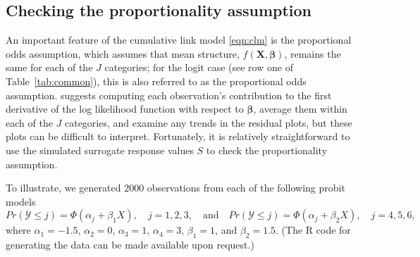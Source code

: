 \subsection{Checking the proportionality assumption}

An important feature of the cumulative link model \eqref{eqn:clm} is the proportional odds assumption, which assumes that mean structure, $f\left(\boldsymbol{X}, \boldsymbol{\beta}\right)$, remains the same for each of the $J$ categories; for the logit case (see row one of Table~\ref{tab:common}), this is also referred to as the proportional odds assumption. \citet[pp. 334--335]{regression-harrell-2001} suggests computing each observation's contribution to the first derivative of the log likelihood function with respect to $\boldsymbol{\beta}$, average them within each of the $J$ categories, and examine any trends in the residual plots, but these plots can be difficult to interpret. Fortunately, it is relatively straightforward to use the simulated surrogate response values $S$ to check the proportionality assumption.

To illustrate, we generated 2000 observations from each of the following probit models
\begin{equation*}
  Pr\left(\mathcal{Y} \le j\right) = \Phi\left(\alpha_j + \beta_1 X\right), \quad j = 1, 2, 3, \quad \textrm{and} \quad Pr\left(\mathcal{Y} \le j\right) = \Phi\left(\alpha_j + \beta_2 X\right), \quad j = 4, 5, 6,
\end{equation*}
where $\alpha_1 = -1.5$, $\alpha_2 = 0$, $\alpha_3 = 1$, $\alpha_4 = 3$, $\beta_1 = 1$, and $\beta_2 = 1.5$. (The R code for generating the data can be made available upon request.) 

